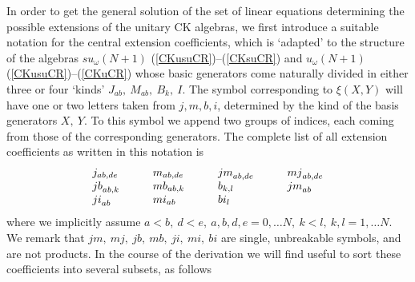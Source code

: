 \documentclass[12pt]{article}
\begin{document}
In order to get the general solution of the set of linear equations
determining the possible extensions of the  unitary CK
algebras, we first introduce a suitable notation for the central
extension coefficients, which is `adapted' to the structure of the
algebras $su_{\omega}(N+1)$  (\ref{CKusuCR})--(\ref{CKsuCR})  and
$u_{\omega}(N+1)$ (\ref{CKusuCR})--(\ref{CKuCR})
whose basic generators come  naturally divided in either three
or four `kinds' ${J}_{ab},\ {M}_{ab},\ {B}_{k},\ {I}$. The symbol
corresponding to ${\xi}(X, Y)$ will have one or two letters taken
from $j, m, b, i$, determined by the kind of the basis generators $X,\
Y$. To this symbol we append two groups of indices, each coming from
those of the corresponding generators.  The complete list of all
extension coefficients as written in this notation is
\begin{equation}
\begin{array}{llll}
 {j}_{ab,de}&\qquad {m}_{ab,de}&\qquad {jm}_{ab,de} &\qquad {mj}_{ab,de}\cr
 {jb}_{ab,k} &\qquad{mb}_{ab,k} &\qquad{b}_{k,l} &\qquad{jm}_{ab} \cr
 {ji}_{ab} &\qquad {mi}_{ab}&\qquad {bi}_l &\qquad
\end{array}
\label{EC}
\end{equation}
where we implicitly assume $a<b,\ d<e,\ a,b,d,e=0, \dots N, \ k<l,
\ k, l=1, \dots N$. We remark that ${jm},\ {mj},\ {jb},\ {mb},\ {ji},\ {mi},\
{bi}$ are single, unbreakable symbols, and are not products. In the
course of the derivation we will find useful to sort these
coefficients into several subsets, as follows
\end{document}

